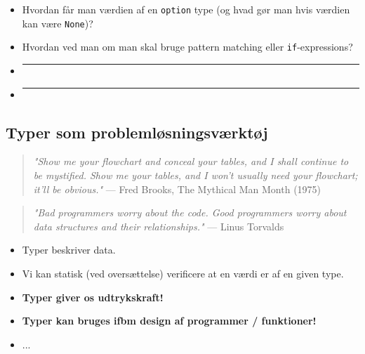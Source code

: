 \documentclass[rgb]{beamer}
\begin{document}
\begin{frame}[fragile]
\begin{footnotesize}

\vspace{2mm}

  \begin{itemize}
  \item Hvordan får man værdien af en \lstinline{option} type (og hvad gør man hvis værdien kan være \lstinline{None})?
\vspace{4mm}
  \item Hvordan ved man om man skal bruge pattern matching eller \lstinline{if}-expressions?
\vspace{4mm}
  \item \rule{.9\textwidth}{0.4pt}
\vspace{4mm}
  \item \rule{.9\textwidth}{0.4pt}
  \end{itemize}

\end{footnotesize}
\end{frame}


\subsection{Typer som problemløsningsværktøj}

\begin{frame}[fragile]
\begin{footnotesize}


  \vspace{3mm}
  \begin{quote}
    \emph{"Show me your flowchart and conceal your tables, and I shall continue to be mystified. Show me your tables, and I won't usually need your flowchart; it'll be obvious."} --- Fred Brooks, The Mythical Man Month (1975)
  \end{quote}

  \vspace{3mm}
  \begin{quote}
    \emph{"Bad programmers worry about the code. Good programmers worry about data structures and their relationships."} --- Linus Torvalds
  \end{quote}


  \vspace{3mm}
  \begin{itemize}
  \item Typer beskriver data.
  \item Vi kan statisk (ved oversættelse) verificere at en
    værdi er af en given type.
  \item \textbf{Typer giver os udtrykskraft!}
  \item \textbf{Typer kan bruges ifbm design af programmer / funktioner!}
  \item ...
  \end{itemize}
\end{footnotesize}
\end{frame}
\end{document}
